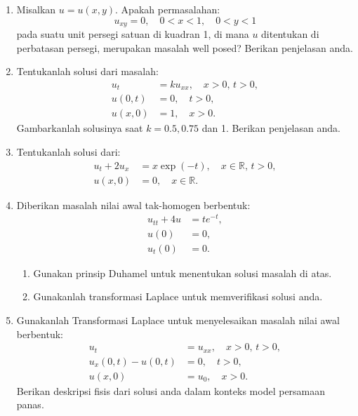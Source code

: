 \documentclass{article}
\begin{document}
\begin{enumerate}
\item Misalkan \( u = u(x, y) \). Apakah permasalahan:  
\[
u_{xy} = 0, \quad 0 < x < 1, \quad 0 < y < 1
\]  
pada suatu unit persegi satuan di kuadran 1, di mana \( u \) ditentukan di perbatasan persegi, merupakan masalah well posed? Berikan penjelasan anda.

\item Tentukanlah solusi dari masalah:  
\begin{align*}
u_t &= k u_{xx}, \quad x > 0, \, t > 0, \\
u(0, t) &= 0, \quad t > 0, \\
u(x, 0) &= 1, \quad x > 0.
\end{align*}  
Gambarkanlah solusinya saat \( k = 0.5, 0.75 \) dan 1. Berikan penjelasan anda.

\item Tentukanlah solusi dari:  
\begin{align*}
u_t + 2u_x &= x \exp(-t), \quad x \in \mathbb{R}, \, t > 0, \\
u(x, 0) &= 0, \quad x \in \mathbb{R}.
\end{align*}

\item Diberikan masalah nilai awal tak-homogen berbentuk:  
\begin{align*}
u_{tt} + 4u &= te^{-t}, \\
u(0) &= 0, \\
u_t(0) &= 0.
\end{align*}  
\begin{enumerate}
\item Gunakan prinsip Duhamel untuk menentukan solusi masalah di atas.  
\item Gunakanlah transformasi Laplace untuk memverifikasi solusi anda.  
\end{enumerate}

\item Gunakanlah Transformasi Laplace untuk menyelesaikan masalah nilai awal berbentuk:  
\begin{align*}
u_t &= u_{xx}, \quad x > 0, \, t > 0, \\
u_x(0, t) - u(0, t) &= 0, \quad t > 0, \\
u(x, 0) &= u_0, \quad x > 0.
\end{align*}  
Berikan deskripsi fisis dari solusi anda dalam konteks model persamaan panas.  

\end{enumerate}
\end{document}
